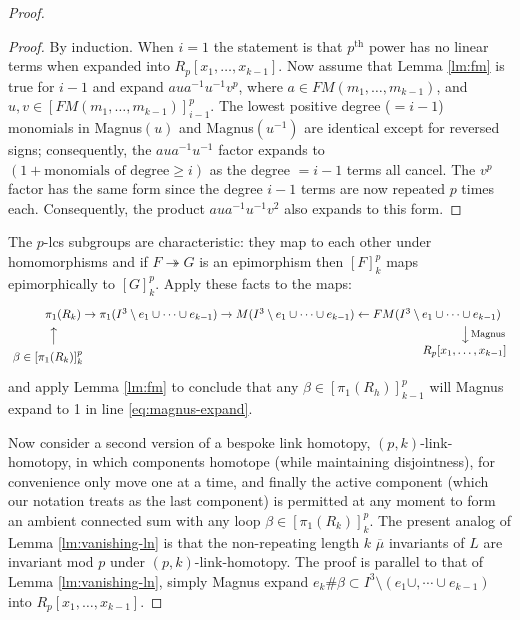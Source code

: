 \documentclass[12pt]{amsart}
\newcommand{\ra}{\rightarrow}
\newcommand{\lbar}[1]{\overline{#1}}
\theoremstyle{definition}
\theoremstyle{remark}
\begin{document}
\begin{proof}
	\begin{proof}
		By induction. When $i=1$ the statement is that $p^\text{th}$ power has no linear terms when expanded into $R_p[x_1,\dots,x_{k-1}]$. Now assume that Lemma \ref{lm:fm} is true for $i-1$ and expand $a u a^{-1} u^{-1} v^p$, where $a \in FM(m_1,\dots,m_{k-1})$, and $u,v \in [FM(m_1, \dots, m_{k-1})]_{i-1}^p$. The lowest positive degree ($= i-1$) monomials in Magnus$(u)$ and Magnus$(u^{-1})$ are identical except for reversed signs; consequently, the $a u a^{-1} u^{-1}$ factor expands to $(1 + \text{monomials of degree} \geq i)$ as the degree $= i-1$ terms all cancel. The $v^p$ factor has the same form since the degree $i-1$ terms are now repeated $p$ times each. Consequently, the product $a u a^{-1} u^{-1} v^2$ also expands to this form.
	\end{proof}

	The $p$-lcs subgroups are characteristic: they map to each other under homomorphisms and if $F \twoheadrightarrow G$ is an epimorphism then $[F]_k^p$ maps epimorphically to $[G]_k^p$. Apply these facts to the maps:
	\begin{equation}
		\begin{tikzpicture}[baseline={(current bounding box.center)}]
			\node at (0,0) {$\pi_1(R_k) \ra \pi_1(I^3 \setminus e_1 \cup \cdots \cup e_{k-1}) \ra M(I^3 \setminus e_1 \cup \cdots \cup e_{k-1}) \leftarrow FM(I^3 \setminus e_1 \cup \cdots \cup e_{k-1})$};
			\node at (6.4,-0.6) {\footnotesize{Magnus}};
			\node[rotate=-90] at (5.7,-0.6) {$\longrightarrow$};
			\node at (5.7,-1.1) {$R_p[x_1,\dots,x_{k-1}]$};
			\node[rotate=90] at (-6.5,-0.65) {$\longrightarrow$};
			\node at (-6.7,-1.3) {$\beta \in [\pi_1(R_k)]_k^p$};
		\end{tikzpicture}
	\end{equation}
	and apply Lemma \ref{lm:fm} to conclude that any $\beta \in [\pi_1(R_h)]_{k-1}^p$ will Magnus expand to 1 in line \ref{eq:magnus-expand}.

	Now consider a second version of a bespoke link homotopy, $(p,k)$-link-homotopy, in which components homotope (while maintaining disjointness), for convenience only move one at a time, and finally the active component (which our notation treats as the last component) is permitted at any moment to form an ambient connected sum with any loop $\beta \in [\pi_1(R_k)]_k^p$. The present analog of Lemma \ref{lm:vanishing-ln} is that the non-repeating length $k$ $\lbar{\mu}$ invariants of $L$ are invariant mod $p$ under $(p,k)$-link-homotopy. The proof is parallel to that of Lemma \ref{lm:vanishing-ln}, simply Magnus expand $e_k \# \beta \subset I^3 \setminus (e_1 \cup, \cdots \cup e_{k-1})$ into $R_p[x_1, \dots, x_{k-1}]$.


\end{proof}
\end{document}
